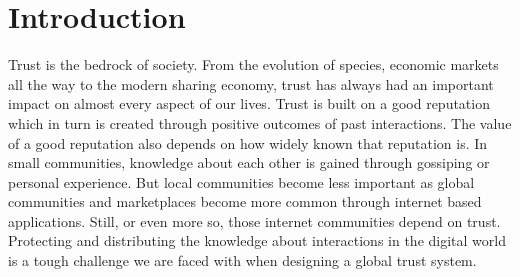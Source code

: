 \chapter{Introduction}
\label{chap:introduction}



Trust is the bedrock of society. From the evolution of species\cite{MOHTASHEMI2003523, nowak2006five, Axelrod1390}, economic markets\cite{akerlof1970lemons} all the way to the 
modern sharing economy\cite{resnick2002trust}, trust has always had an important impact on almost every aspect of our lives.
Trust is built on a good reputation which in turn is created through positive outcomes of past 
interactions. The value of a good reputation also depends on how widely known that reputation is.
In small communities, knowledge about each other is gained through gossiping or personal experience. 
But local communities become less important as global communities and marketplaces become more common
through internet based applications. Still, or even more so, those internet communities depend on 
trust. Protecting and distributing the knowledge about interactions in the digital world is a tough
challenge we are faced with when designing a global trust system.

